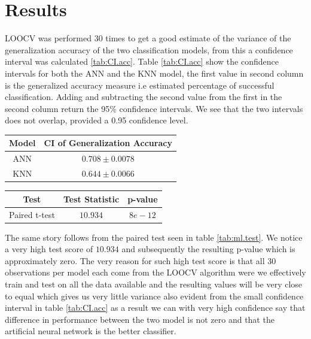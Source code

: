 \documentclass{article}
\begin{document}
\section{Results}
LOOCV was performed 30 times to get a good estimate of the variance of the generalization accuracy of the two classification models, from this a confidence interval was calculated \ref{tab:CI.acc}. Table \ref{tab:CI.acc} show the confidence intervals for both the ANN and the KNN model, the first value in second column is the generalized accuracy measure i.e estimated percentage of successful classification. Adding and subtracting the second value from the first in the second column return the 95\% confidence intervals. We see that the two intervals does not overlap, provided a 0.95 confidence level.

\begin{minipage}{\linewidth}
\centering
{} 
\begin{tabular}{ c c}\toprule[2pt]
\bf Model  & \bf CI of Generalization Accuracy \\\midrule[1.5pt]
ANN  & $0.708 \pm 0.0078$  \\\midrule
KNN  & $0.644 \pm 0.0066$ \\
\bottomrule[1.25pt]
\end {tabular}\par
\label{tab:CI.acc}
\end{minipage} \bigskip

\begin{minipage}{\linewidth}
	\centering
	\begin{tabular}{ c c c}\toprule[1.5pt]
	\bf Test  & \bf Test Statistic & \bf p-value \\\midrule[1.5pt]
	Paired t-test  & $10.934$ &  $8e-12$ \\
	\bottomrule[1.5pt]
	\end {tabular}\par
	\label{tab:ml.test}
\end{minipage} \bigskip

The same story follows from the paired test seen in table \ref{tab:ml.test}. We notice a very high test score of $10.934$ and subsequently the resulting p-value which is approximately zero. The very reason for such high test score is that all 30 observations per model each come from the LOOCV algorithm were we effectively train and test on all the data available and the resulting values will be very close to equal which gives us very little variance also evident from the small confidence interval in table \ref{tab:CI.acc} as a result we can with very high confidence say that difference in performance between the two model is not zero and that the artificial neural network is the better classifier.
\end{document}
